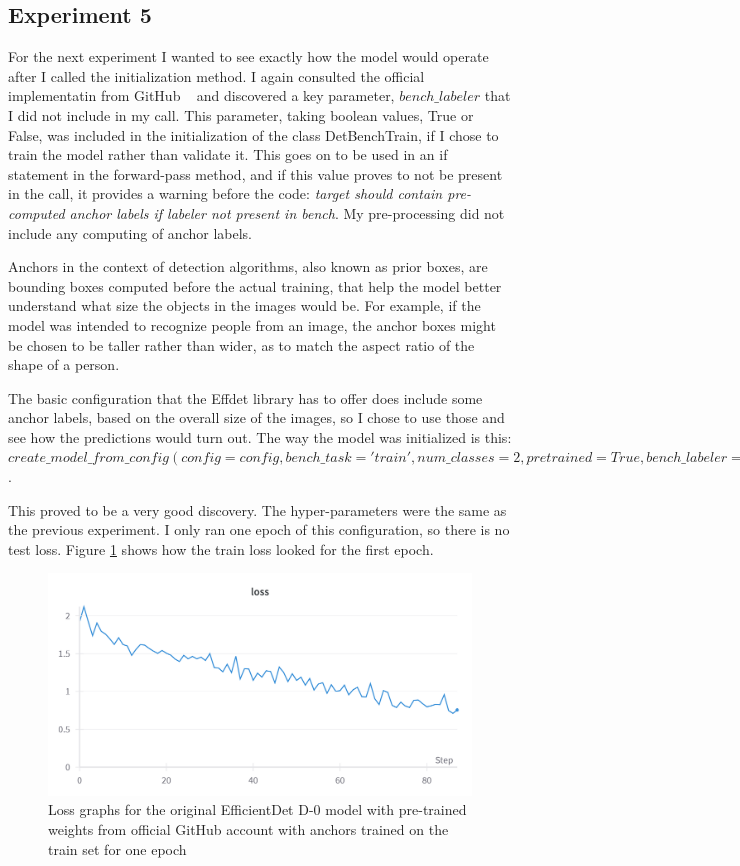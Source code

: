 \subsection{Experiment 5}

For the next experiment I wanted to see exactly how the model would operate after I called the initialization method. I again consulted the official implementatin from GitHub ~\cite{link7} and discovered a key parameter, $bench\_labeler$ that I did not include in my call. This parameter, taking boolean values, True or False, was included in the initialization of the class DetBenchTrain, if I chose to train the model rather than validate it. This goes on to be used in an if statement in the forward-pass method, and if this value proves to not be present in the call, it provides a warning before the code: \textit{target should contain pre-computed anchor labels if labeler not present in bench}. My pre-processing did not include any computing of anchor labels.

Anchors in the context of detection algorithms, also known as prior boxes, are bounding boxes computed before the actual training, that help the model better understand what size the objects in the images would be. For example, if the model was intended to recognize people from an image, the anchor boxes might be chosen to be taller rather than wider, as to match the aspect ratio of the shape of a person.~\cite{link11}

The basic configuration that the Effdet library has to offer does include some anchor labels, based on the overall size of the images, so I chose to use those and see how the predictions would turn out. The way the model was initialized is this: $create\_model\_from\_config(config=config, bench\_task='train', num\_classes=2, pretrained=True, bench\_labeler = True)$.

This proved to be a very good discovery. The hyper-parameters were the same as the previous experiment. I only ran one epoch of this configuration, so there is no test loss. Figure \ref{fig:fig34} shows how the train loss looked for the first epoch.

\begin{figure}[H]
    \centering
    \includegraphics[width=0.5\linewidth]{figures/Figure43.png}
    \caption{Loss graphs for the original EfficientDet D-0 model with pre-trained weights from official GitHub account with anchors trained on the train set for one epoch}
    \label{fig:fig34}
\end{figure}

